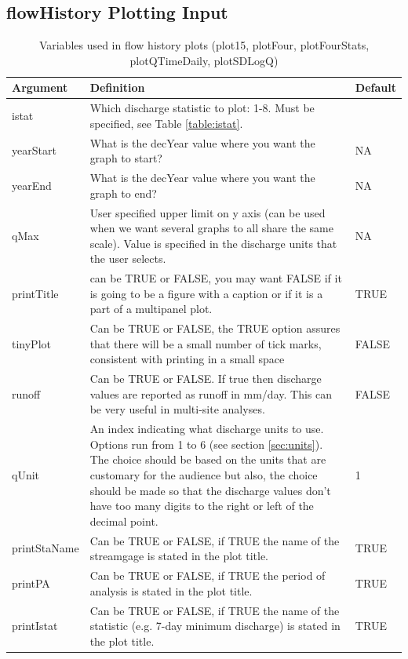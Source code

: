 \documentclass[a4paper,11pt]{article}\usepackage[]{graphicx}\usepackage[]{color}
\begin{document}
\subsection{flowHistory Plotting Input}
\label{sec:flowHistoryVariables}
\begin{table}[ht]
  \centering
  \begin{threeparttable}[b]
\caption{Variables used in flow history plots (plot15, plotFour, plotFourStats, plotQTimeDaily, plotSDLogQ) 
\label{tab:flowHistoryVariables}}
\begin{tabularx}{\textwidth}{lXl}
\hline
  \textbf{Argument} & \textbf{Definition} & \textbf{Default} \\
\hline
istat & Which discharge statistic to plot: 1-8.  Must be specified, see Table \ref{table:istat}. & \\
yearStart\tnote{1} & What is the decYear value where you want the graph to start? & NA\\
yearEnd\tnote{1} & What is the decYear value where you want the graph to end? & NA\\
qMax & User specified upper limit on y axis (can be used when we want several graphs to all share the same scale). Value is specified in the discharge units that the user selects. & NA\\
printTitle & can be TRUE or FALSE, you may want FALSE if it is going to be a figure with a caption or if it is a part of a multipanel plot. & TRUE\\
tinyPlot & Can be TRUE or FALSE, the TRUE option assures that there will be a small number of tick marks, consistent with printing in a small space & FALSE\\
runoff & Can be TRUE or FALSE.  If true then discharge values are reported as runoff in mm/day.  This can be very useful in multi-site analyses. & FALSE\\
qUnit & An index indicating what discharge units to use.  Options run from 1 to 6 (see section \ref{sec:units}).  The choice should be based on the units that are customary for the audience but also, the choice should be made so that the discharge values don't have too many digits to the right or left of the decimal point. & 1\\
printStaName\tnote{2} & Can be TRUE or FALSE, if TRUE the name of the streamgage is stated in the plot title. & TRUE\\
printPA\tnote{2} & Can be TRUE or FALSE, if TRUE the period of analysis is stated in the plot title. & TRUE\\
printIstat\tnote{2} & Can be TRUE or FALSE, if TRUE the name of the statistic (e.g. 7-day minimum discharge) is stated in the plot title. & TRUE\\


\end{tabularx}
\end{threeparttable}
\end{table}
\end{document}

